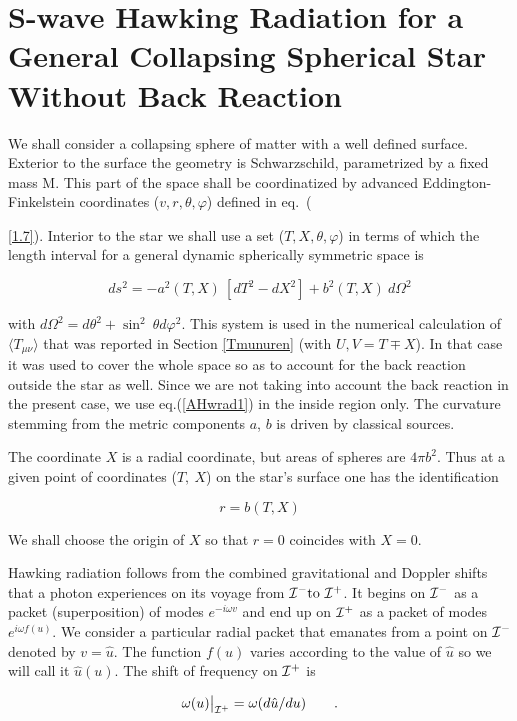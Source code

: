 \documentclass[12pt,oneside]{report}
\def\beq {\begin{equation}}
\def\feq {\end{equation}}
\begin{document}
\chapter{S-wave Hawking Radiation for a General Collapsing Spherical
Star Without Back Reaction
 }\label{sphradd}


We shall consider a collapsing sphere of matter with a well
defined surface. Exterior to the surface the geometry is
Schwarzschild, parametrized by a fixed mass M. This part of
the space shall be coordinatized by advanced Eddington-Finkelstein
 coordinates ($ v, r,\theta, \varphi $) defined in eq.~({\ref{1.7}).
 Interior to the star we
shall use a set ($ T, X, \theta, \varphi $) in terms of which the length interval for
a general dynamic spherically symmetric space is

\beq  ds^2 = -a^2 (T, X)\  [dT^2-dX^2 ] + b^2 (T, X)\  d\Omega^2
\label{AHwrad1} \feq

\noindent with $  d \Omega^2 = d \theta^2 + \sin^2\ \theta d
\varphi^2 $. This system is used in the  numerical calculation
of $\langle T_{\mu \nu} \rangle$ that was reported in 
Section \ref{Tmunuren} (with $U, V = T \mp X$). In that case it was
used to cover the whole space so as to account for the back
reaction outside the star as well. Since we are not taking
into account the back reaction in the present case, we use
eq.(\ref{AHwrad1}) in the inside region only. The curvature stemming from
the metric components $a$, $b$ is driven by classical sources.


The coordinate $X$ is a radial coordinate, but areas of
spheres are $ 4 \pi b^2$. Thus at a given point of coordinates ($T,\ X$) on the
star's surface one has the identification

\beq r = b (T, X) \label{AHwrad2}\feq


\noindent We shall choose the origin of $X$ so that $r = 0$
coincides with $X = 0$.

Hawking radiation follows from the combined gravitational and
Doppler shifts that a photon experiences on its voyage from
${\cal I}^- \mbox{\rm to } {\cal I}^+$. It begins on ${\cal I}^-$ as a
packet (superposition) of modes $ e^{-i\omega v}$ and end up on $ {\cal I}^+$ as a
packet of modes $ e^{i \omega f(u)}$. We consider a particular radial packet
that emanates from a point on $ {\cal I} ^-$ denoted by $ v =
{\hat u} $. The function $f(u)$ varies according to the value of
$ \hat u$ so we will call it $ \hat u (u)$. The shift of
frequency on $ {\cal I} ^+$ is

\beq \omega (u)\big|_{{\cal I}^+} = \omega (d {\hat u} / d
u)\qquad . \label{AHwrad3}\feq


}
\end{document}
